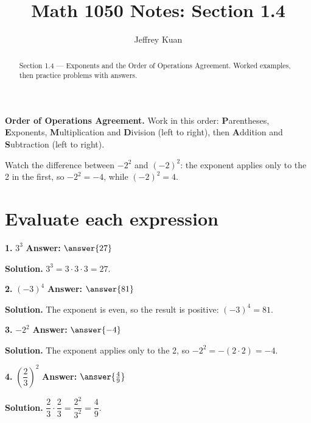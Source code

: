 \documentclass{ximera}
\author{Jeffrey Kuan}
\title{Math 1050 Notes: Section 1.4}
\begin{document}
\begin{abstract}
    Section 1.4 --- Exponents and the Order of Operations Agreement.
    Worked examples, then practice problems with answers.
\end{abstract}

\maketitle

\textbf{Order of Operations Agreement.} Work in this order: \textbf{P}arentheses,
\textbf{E}xponents, \textbf{M}ultiplication and \textbf{D}ivision (left to right), then
\textbf{A}ddition and \textbf{S}ubtraction (left to right).

Watch the difference between $-2^{2}$ and $(-2)^{2}$: the exponent applies only to the 2
in the first, so $-2^{2}=-4$, while $(-2)^{2}=4$.

\section*{Evaluate each expression}

\begin{problem}
\textbf{1.} $3^{3}$ \qquad \textbf{Answer:} $\answer{27}$

\begin{hint}
\textbf{Solution.} $3^{3}=3\cdot 3\cdot 3=27$.
\end{hint}
\end{problem}

\begin{problem}
\textbf{2.} $(-3)^{4}$ \qquad \textbf{Answer:} $\answer{81}$

\begin{hint}
\textbf{Solution.} The exponent is even, so the result is positive: $(-3)^{4}=81$.
\end{hint}
\end{problem}

\begin{problem}
\textbf{3.} $-2^{2}$ \qquad \textbf{Answer:} $\answer{-4}$

\begin{hint}
\textbf{Solution.} The exponent applies only to the 2, so $-2^{2}=-(2\cdot 2)=-4$.
\end{hint}
\end{problem}

\begin{problem}
\textbf{4.} $\left(\dfrac{2}{3}\right)^{2}$ \qquad \textbf{Answer:} $\answer{\frac{4}{9}}$

\begin{hint}
\textbf{Solution.} $\dfrac{2}{3}\cdot\dfrac{2}{3}=\dfrac{2^{2}}{3^{2}}=\dfrac{4}{9}$.
\end{hint}
\end{problem}
\end{document}
